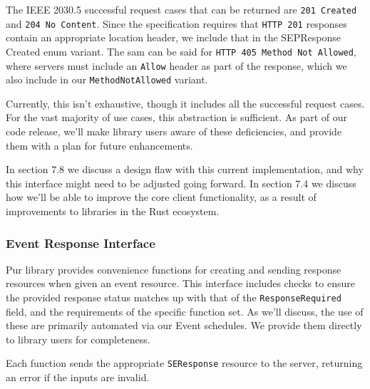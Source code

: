 The IEEE 2030.5 successful request cases that can be returned are \texttt{201 Created} and \texttt{204 No Content}. Since the specification requires that \texttt{HTTP 201} responses contain an appropriate location header, we include that in the SEPResponse Created enum variant. The sam can be said for \texttt{HTTP 405 Method Not Allowed}, where servers must include an \texttt{Allow} header as part of the response, which we also include in our \texttt{MethodNotAllowed} variant.

Currently, this isn't exhaustive, though it includes all the successful request cases. For the vast majority of use cases, this abstraction is sufficient. As part of our code release, we'll make library users aware of these deficiencies, and provide them with a plan for future enhancements.

In section 7.8 we discuss a design flaw with this current implementation, and why this interface might need to be adjusted going forward. In section 7.4 we discuss how we'll be able to improve the core client functionality, as a result of improvements to libraries in the Rust ecosystem.

\subsubsection{Event Response Interface}

Pur library provides convenience functions for creating and sending response resources when given an event resource. This interface includes checks to ensure the provided response status matches up with that of the \texttt{ResponseRequired} field, and the requirements of the specific function set.  As we'll discuss, the use of these are primarily automated via our Event schedules. We provide them directly to library users for completeness.

Each function sends the appropriate \texttt{SEResponse} resource to the server, returning an error if the inputs are invalid.


